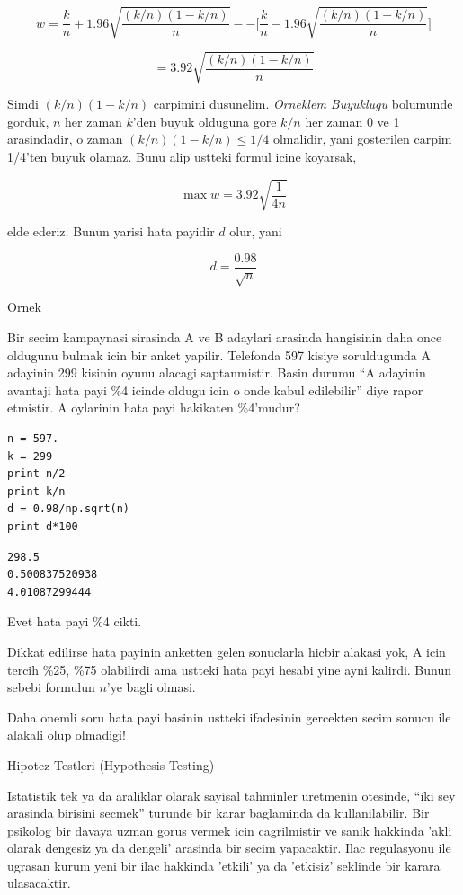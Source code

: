 \documentclass[12pt,fleqn]{article}\usepackage{../common}
\begin{document}
$$ w = \frac{k}{n} + 
1.96 \sqrt{\frac{(k/n)(1-k/n)}{n}} - 
- \bigg[ 
\frac{k}{n} -
1.96 \sqrt{\frac{(k/n)(1-k/n)}{n}}
\bigg]
 $$

$$ = 3.92 \sqrt{\frac{(k/n)(1-k/n)}{n}} $$

Simdi $(k/n)(1-k/n)$ carpimini dusunelim. {\em Orneklem Buyuklugu}
bolumunde gorduk, $n$ her zaman $k$'den buyuk olduguna gore $k/n$ her zaman
0 ve 1 arasindadir, o zaman $(k/n)(1-k/n) \le 1/4$ olmalidir, yani
gosterilen carpim 1/4'ten buyuk olamaz. Bunu alip ustteki formul icine
koyarsak,

$$ \max w = 3.92 \sqrt{\frac{1}{4n}} $$

elde ederiz. Bunun yarisi hata payidir $d$ olur, yani

$$ d = \frac{0.98}{\sqrt{n}} $$

Ornek

Bir secim kampaynasi sirasinda A ve B adaylari arasinda hangisinin daha
once oldugunu bulmak icin bir anket yapilir. Telefonda 597 kisiye
soruldugunda A adayinin 299 kisinin oyunu alacagi saptanmistir. Basin
durumu ``A adayinin avantaji hata payi \%4 icinde oldugu icin o onde kabul
edilebilir'' diye rapor etmistir. A oylarinin hata payi hakikaten \%4'mudur?

\begin{verbatim}
n = 597.
k = 299
print n/2
print k/n
d = 0.98/np.sqrt(n) 
print d*100
\end{verbatim}

\begin{verbatim}
298.5
0.500837520938
4.01087299444
\end{verbatim}

Evet hata payi \%4 cikti. 

Dikkat edilirse hata payinin anketten gelen sonuclarla hicbir alakasi yok,
A icin tercih \%25, \%75 olabilirdi ama ustteki hata payi hesabi yine ayni
kalirdi. Bunun sebebi formulun $n$'ye bagli olmasi. 

Daha onemli soru hata payi basinin ustteki ifadesinin gercekten secim
sonucu ile alakali olup olmadigi! 

Hipotez Testleri (Hypothesis Testing)

Istatistik tek ya da araliklar olarak sayisal tahminler uretmenin otesinde,
``iki sey arasinda birisini secmek'' turunde bir karar baglaminda da
kullanilabilir. Bir psikolog bir davaya uzman gorus vermek icin
cagrilmistir ve sanik hakkinda 'akli olarak dengesiz ya da dengeli'
arasinda bir secim yapacaktir. Ilac regulasyonu ile ugrasan kurum yeni bir
ilac hakkinda 'etkili' ya da 'etkisiz' seklinde bir karara ulasacaktir. 
\end{document}
